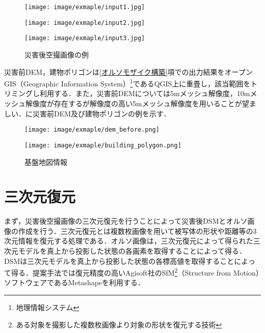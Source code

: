     \begin{figure}[tbp]
      \begin{minipage}[c]{0.329\hsize}
        \centering
        \texttt{[image: image/exmaple/input1.jpg]}
        \label{入力画像例1}
      \end{minipage}
      \begin{minipage}[c]{0.329\hsize}
        \centering
        \texttt{[image: image/exmaple/input2.jpg]}
        \label{入力画像例2}
      \end{minipage}
      \begin{minipage}[c]{0.329\hsize}
        \centering
        \texttt{[image: image/exmaple/input3.jpg]}
        \label{入力画像例3}
      \end{minipage}
      \caption{災害後空撮画像の例}
      \label{空撮画像例}
    \end{figure}

    災害前DEM，建物ポリゴンは\ref{オルソモザイク構築}項での出力結果をオープンGIS（Geographic Information System）\footnote{地理情報システム}であるQGIS\cite{QGIS}上に重畳し，該当範囲をトリミングし利用する．また，災害前DEMについては5mメッシュ解像度，10mメッシュ解像度が存在するが解像度の高い5mメッシュ解像度を用いることが望ましい．に災害前DEM及び建物ポリゴンの例を示す．

    \begin{figure}[tbp]
      \begin{minipage}[c]{0.45\hsize}
        \centering
        \texttt{[image: image/exmaple/dem\_before.png]}
      \end{minipage}
      \begin{minipage}[c]{0.45\hsize}
        \centering
        \texttt{[image: image/exmaple/building\_polygon.png]}
      \end{minipage}
      \caption{基盤地図情報}
      \label{基盤地図情報}
    \end{figure}



  \section{三次元復元}
    まず，災害後空撮画像の三次元復元を行うことによって災害後DSMとオルソ画像の作成を行う．三次元復元とは複数枚画像を用いて被写体の形状や距離等の3次元情報を復元する処理である．オルソ画像は，三次元復元によって得られた三次元モデルを真上から投影した状態の各画素を取得することによって得る．DSMは三次元モデルを真上から投影した状態の各標高値を取得することによって得る．提案手法では復元精度の高いAgisoft社のSfM\footnote{ある対象を撮影した複数枚画像より対象の形状を復元する技術}（Structure from Motion）ソフトウェアであるMetashape\cite{Metashape}を利用する．


